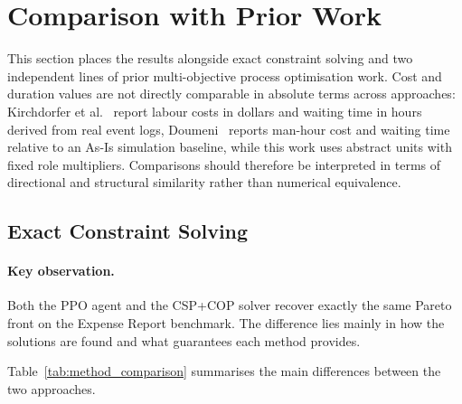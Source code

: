 \section{Comparison with Prior Work}
\label{sec:discussion_prior_work}

This section places the results alongside exact constraint solving and two independent lines of prior multi-objective process optimisation work. Cost and duration values are not directly comparable in absolute terms across approaches: Kirchdorfer et al.~\cite{KirchdorferLukasFromPolicies} report labour costs in dollars and waiting time in hours derived from real event logs, Doumeni~\cite{ArtemisDoumeniParetoAgentSimulator} reports man-hour cost and waiting time relative to an As-Is simulation baseline, while this work uses abstract units with fixed role multipliers. Comparisons should therefore be interpreted in terms of directional and structural similarity rather than numerical equivalence.

\subsection{Exact Constraint Solving}
\label{sec:discussion_csp_comparison}

\paragraph{Key observation.} Both the \ac{PPO} agent and the CSP+COP solver recover exactly the same Pareto front on the Expense Report benchmark. The difference lies mainly in how the solutions are found and what guarantees each method provides.

Table~\ref{tab:method_comparison} summarises the main differences between the two approaches.

